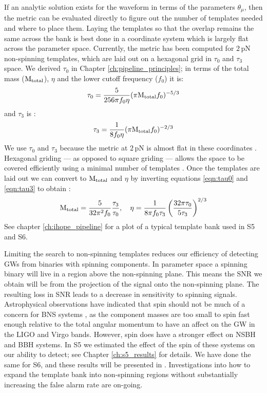 If an analytic solution exists for the waveform in terms of the parameters $\theta_\mu$, then the metric can be evaluated directly to figure out the number of templates needed and where to place them. Laying the templates so that the overlap remains the same across the bank is best done in a coordinate system which is largely flat across the parameter space. Currently, the metric has been computed for $2\,$\ac{pN} non-spinning templates, which are laid out on a hexagonal grid in $\tau_0$ and $\tau_3$ space. We derived $\tau_0$ in Chapter \ref{ch:pipeline_principles}; in terms of the total mass ($\mathrm{M_{total}}$), $\eta$ and the lower cutoff frequency ($f_0$) it is:
\begin{equation}
\label{eqn:tau0}
\tau_0 = \frac{5}{256\pi f_0 \eta}(\pi \mtotal f_0)^{-5/3}
\end{equation}
and $\tau_3$ is \cite{BBCCS:2006}:
\begin{equation}
\label{eqn:tau3}
\tau_3 = \frac{1}{8 f_0 \eta}(\pi \mtotal f_0)^{-2/3}
\end{equation}
We use $\tau_0$ and $\tau_3$ because the metric at $2\,$\ac{pN} is almost flat in these coordinates \cite{BBCCS:2006}. Hexagonal griding --- as opposed to square griding --- allows the space to be covered efficiently using a minimal number of templates \cite{hexabank}. Once the templates are laid out we can convert to $\mathrm{M_{total}}$ and $\eta$ by inverting equations \ref{eqn:tau0} and \ref{eqn:tau3} to obtain \cite{BBCCS:2006}:
\begin{equation}
\mathrm{M_{total}} = \frac{5}{32\pi^2 f_0}\frac{\tau_3}{\tau_0}, \quad \eta = \frac{1}{8\pi f_0 \tau_3}\left(\frac{32\pi \tau_0}{5\tau_3}\right)^{2/3}
\end{equation}
See chapter \ref{ch:ihope_pipeline} for a plot of a typical template bank used in \ac{S5} and \ac{S6}.

Limiting the search to non-spinning templates reduces our efficiency of detecting \acp{GW} from binaries with spinning components. In parameter space a spinning binary will live in a region above the non-spinning plane. This means the \ac{SNR} we obtain will be from the projection of the signal onto the non-spinning plane. The resulting loss in \ac{SNR} leads to a decrease in sensitivity to spinning signals. Astrophysical observations have indicated that spin should not be much of a concern for \ac{BNS} systems \cite{ATNF:psrcat,Apostolatos:1994}, as the component masses are too small to spin fast enough relative to the total angular momentum to have an affect on the \ac{GW} in the \ac{LIGO} and Virgo bands. However, spin does have a stronger effect on \ac{NSBH} and \ac{BBH} systems. In \ac{S5} we estimated the effect of the spin of these systems on our ability to detect; see Chapter \ref{ch:s5_results} for details. We have done the same for \ac{S6}, and these results will be presented in \cite{Collaboration:S6CBClowmass}. Investigations into how to expand the template bank into non-spinning regions without substantially increasing the false alarm rate are on-going.

